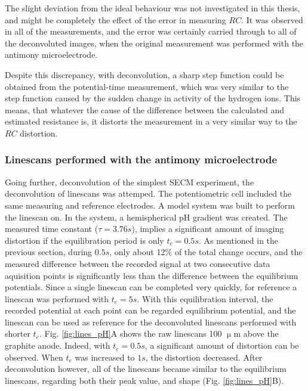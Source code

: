 The slight deviation from the ideal behaviour was not investigated in this thesis, and might be completely the effect of the error in measuring $RC$.
It was observed in all of the measurements, and the error was certainly carried through to all of the deconvoluted images, when the original measurement was performed with the antimony microelectrode. 

Despite this discrepancy, with deconvolution, a sharp step function could be obtained from the potential-time measurement, which was very similar to the step function caused by the sudden change in activity of the hydrogen ions.
This means, that whatever the cause of the difference between the calculated and estimated resistance is, it distorts the measurement in a very similar way to the $RC$ distortion.

			\subsubsection{Linescans performed with the antimony microelectrode}

Going further, deconvolution of the simplest SECM experiment, the deconvolution of linescans was attemped.
The potentiometric cell included the same measuring and reference electrodes.
A model system was built to perform the linescan on.
In the system, a hemispherical pH gradient was created.
The measured time constant ($\tau = 3.76 s$), implies a significant amount of imaging distortion if the equilibration period is only $t_e = 0.5 s$.
As mentioned in the previous section, during $0.5 s$, only about 12\% of the total change occurs, and the measured difference between the recorded signal at two consecutive data aquisition points is significantly less than the difference between the equilibrium potentials.
Since a single linescan can be completed very quickly, for reference a linescan was performed with $t_e = 5 s$.
With this equilibration interval, the recorded potential at each point can be regarded equilibrium potential, and the linescan can be used as reference for the deconvoluted linescans performed with shorter $t_e$.
Fig. \ref{fig:lines_pH}A shows the raw linescans 100 $\upmu$m above the graphite anode.
Indeed, with $t_e = 0.5 s$, a significant amount of distortion can be observed.
When $t_e$ was increased to $1 s$, the distortion decreased.
After deconvolution however, all of the linescans became similar to the equilibrium linescans, regarding both their peak value, and shape (Fig. \ref{fig:lines_pH}B).


